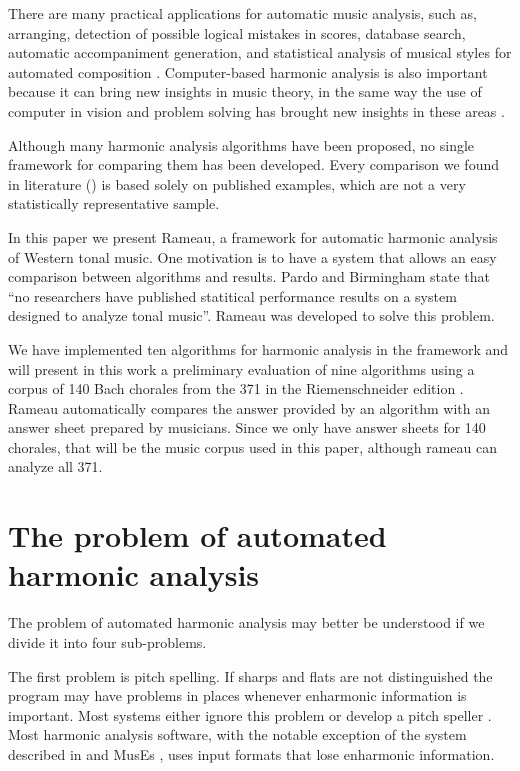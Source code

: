 \documentclass{article}
\begin{document}
There are many practical applications for automatic music analysis,
such as, arranging, detection of possible logical mistakes in scores,
database search, automatic accompaniment generation, and statistical
analysis of musical styles for automated composition
\cite{pardo.ea:algorithms,temperley.ea:modeling}. Computer-based
harmonic analysis is also important because it can bring new insights
in music theory, in the same way the use of computer in vision and
problem solving has brought new insights in these areas
\cite{temperley.ea:modeling}.

Although many harmonic analysis algorithms have been proposed, no
single framework for comparing them has been developed. Every
comparison we found in literature (\cite{pardo.ea:automated,
  barthelemy.ea:figured, tsui:harmonic, taube:automatic,
  illescas.ea:harmonic}) is based solely on published examples, which
are not a very statistically representative sample.

In this paper we present Rameau, a framework for automatic harmonic
analysis of Western tonal music. One motivation is to have a system
that allows an easy comparison between algorithms and results. Pardo
and Birmingham \cite{pardo.ea:automated} state that ``no researchers
have published statitical performance results on a system designed to
analyze tonal music''. Rameau was developed to solve this problem.

We have implemented ten algorithms for harmonic analysis in the
framework and will present in this work a preliminary evaluation of
nine algorithms using a corpus of 140 Bach chorales from the 371 in
the Riemenschneider edition \cite{bach:371}. Rameau automatically
compares the answer provided by an algorithm with an answer sheet
prepared by musicians. Since we only have answer sheets for 140
chorales, that will be the music corpus used in this paper, although
rameau can analyze all 371.

\section{The problem of automated harmonic analysis}
\label{sec:problem}

The problem of automated harmonic analysis may better be understood if
we divide it into four sub-problems.

The first problem is pitch spelling. If sharps and flats are not
distinguished the program may have problems in places whenever
enharmonic information is important. Most systems either ignore this
problem or develop a pitch speller \cite{temperley.ea:modeling}. Most
harmonic analysis software, with the notable exception of the system
described in \cite{illescas.ea:harmonic} and MusEs
\cite{pachet.ea:representing}, uses input formats that lose
enharmonic information.
\end{document}

